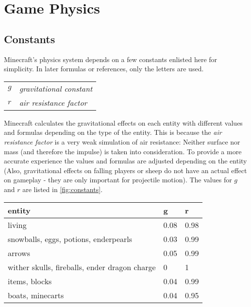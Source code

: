 \section{Game Physics}

\subsection{Constants}

Minecraft's physics system depends on a few constants enlisted here for simplicity. In later formulas or references, only the letters are used.

\begin{center}
    \begin{tabular}{l l}
        $g$ &\textit{gravitational constant} \\
        $r$ & \textit{air resistance factor}
    \end{tabular}
\end{center}

Minecraft calculates the gravitational effects on each entity with different values and formulas depending on the type of the entity. This is because the \textit{air resistance factor} is a very weak simulation of air resistance: Neither surface nor mass (and therefore the impulse) is taken into consideration. To provide a more accurate experience the values and formulas are adjusted depending on the entity (Also, gravitational effects on falling players or sheep do not have an actual effect on gameplay - they are only important for projectile motion). The values for $g$ and $r$ are listed in \figurename{} \ref{fig:constants}.

\begin{figure*}[h]
    \vspace{10pt}
    \centering
    \begin{tabular}{l|l l}
        \textbf{entity} & \textbf{g} & \textbf{r} \\
        \hline
        living                                          & 0.08 & 0.98 \\
        snowballs, eggs, potions, enderpearls           & 0.03 & 0.99 \\
        arrows                                          & 0.05 & 0.99 \\
        wither skulls, fireballs, ender dragon charge   & 0    & 1 \\
        items, blocks                                   & 0.04 & 0.99 \\
        boats, minecarts                                & 0.04 & 0.95
    \end{tabular}
    \caption { physics constants by entity type (source: \href{https://minecraft.gamepedia.com/Entity}{wiki}) }
    \label{fig:constants}
\end{figure*}

